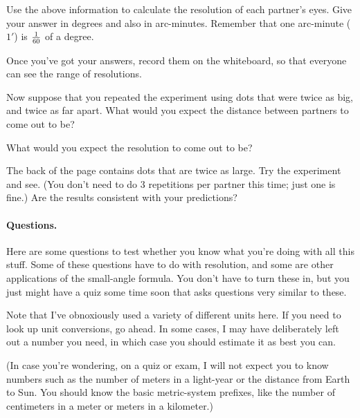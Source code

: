\vskip 1in

Use the above information to calculate the resolution of each
partner's eyes. Give your answer in degrees and also in
arc-minutes. Remember that one arc-minute ($1'$) is $1\over 60$ of
a degree.

\vskip 2.5in

Once you've got your answers, record them on the whiteboard,
so that everyone can see the range of resolutions.

Now suppose that you repeated the experiment using dots that
were twice as big, and twice as far apart.
What would you expect the distance between partners to come out to be?

\vskip 1in

What would you expect the resolution to come out to be?

\vskip 1in

The back of the page contains dots that are twice as large.
Try the experiment and see. (You don't need to do 3 repetitions per partner
this time; just one is fine.) Are the results consistent with
your predictions?

\vskip 1in

\paragraph{Questions.}

Here are some questions to test whether you know what you're doing
with all this stuff. Some of these questions have to
do with resolution, and some are other applications of
the small-angle formula.
You don't have to turn these in, but 
you just might have a quiz some time soon that asks questions very similar
to these.

Note that I've obnoxiously used a variety of different units here.
If you need to look up unit conversions, go ahead. 
In some cases, I may have deliberately left out a number you need, in which case
you should estimate it as best you can.

(In case you're wondering, on a quiz or exam, I will not expect you to know 
numbers such as the number of meters
in a light-year or the distance from Earth to Sun.
You should know the basic
metric-system prefixes, like the number of centimeters in a meter
or meters in a kilometer.)

